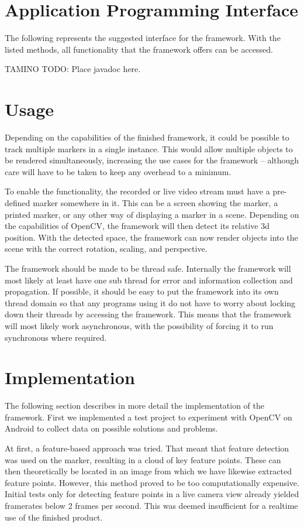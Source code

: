 \section{Application Programming Interface}

The following represents the suggested interface for the framework.
With the listed methods, all functionality that the framework offers can be accessed.

TAMINO TODO: Place javadoc here.

\section{Usage}

Depending on the capabilities of the finished framework, it could be possible to track multiple markers in a single instance.
This would allow multiple objects to be rendered simultaneously, increasing the use cases for the framework – although care will have to be taken to keep any overhead to a minimum.

To enable the functionality, the recorded or live video stream must have a pre-defined marker somewhere in it.
This can be a screen showing the marker, a printed marker, or any other way of displaying a marker in a scene.
Depending on the capabilities of OpenCV, the framework will then detect its relative 3d position.
With the detected space, the framework can now render objects into the scene with the correct rotation, scaling, and perspective.

The framework should be made to be thread safe.
Internally the framework will most likely at least have one sub thread for error and information collection and propagation.
If possible, it should be easy to put the framework into its own thread domain so that any programs using it do not have to worry about locking down their threads by accessing the framework.
This means that the framework will most likely work asynchronous, with the possibility of forcing it to run synchronous where required.

\section{Implementation}

The following section describes in more detail the implementation of the framework.
First we implemented a test project to experiment with OpenCV on Android to collect data on possible solutions and problems.

At first, a feature-based approach was tried.
That meant that feature detection was used on the marker, resulting in a cloud of key feature points.
These can then theoretically be located in an image from which we have likewise extracted feature points.
However, this method proved to be too computationally expensive.
Initial tests only for detecting feature points in a live camera view already yielded framerates below 2 frames per second.
This was deemed insufficient for a realtime use of the finished product.

